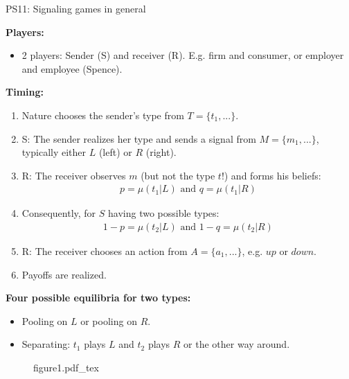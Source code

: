 \begin{frame}{PS11: Signaling games in general}
    \begin{multicols}{2}
      \textbf{Players:}\vspace{-8pt}
      \begin{itemize}
        \item 2 players: Sender (S) and receiver (R). E.g. firm and consumer, or employer and employee (Spence).
      \end{itemize}\vspace{-6pt}
      \textbf{Timing:}\vspace{-8pt}
      \begin{enumerate}
        \item Nature chooses the sender's type from $T=\{t_1,...\}$.
        \item S: The sender realizes her type and sends a signal from $M=\{m_1,...\}$, typically either $L$ (left) or $R$ (right).
        \item R: The receiver observes $m$ (but not the type $t$!) and forms his beliefs:\vspace{-5pt}
        \begin{align*}
          p=\mu(t_1|L)\text{ and }q=\mu(t_1|R)
        \end{align*}
        \item[] \vspace{-4pt} Consequently, for $S$ having two possible types:\vspace{-5pt}
        \begin{align*}
          1-p=\mu(t_2|L)\text{ and }1-q=\mu(t_2|R)
        \end{align*}
        \item \vspace{-4pt} R: The receiver chooses an action from $A=\{a_1,...\}$, e.g. $up$ or $down$.
        \item Payoffs are realized.
      \end{enumerate}\vspace{-6pt}
      \textbf{Four possible equilibria for two types:}\vspace{-6pt}
      \begin{itemize}
        \item Pooling on $L$ or pooling on $R$.
        \item Separating: $t_1$ plays $L$ and $t_2$ plays $R$ or the other way around.
      \end{itemize}
      \vfill\null\columnbreak
      \begin{figure}[!h]
        \center
        \def\svgwidth{\columnwidth}
        {figure1.pdf_tex}
      \end{figure}
      \vfill\null
    \end{multicols}
\end{frame}

